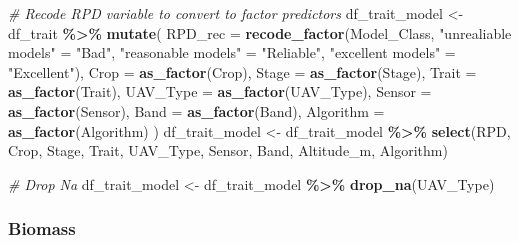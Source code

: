 \documentclass[
]{article}
\newenvironment{Shaded}{\begin{snugshade}}{\end{snugshade}}
\newcommand{\AttributeTok}[1]{\textcolor[rgb]{0.13,0.29,0.53}{#1}}
\newcommand{\CommentTok}[1]{\textcolor[rgb]{0.56,0.35,0.01}{\textit{#1}}}
\newcommand{\FunctionTok}[1]{\textcolor[rgb]{0.13,0.29,0.53}{\textbf{#1}}}
\newcommand{\NormalTok}[1]{#1}
\newcommand{\OtherTok}[1]{\textcolor[rgb]{0.56,0.35,0.01}{#1}}
\newcommand{\SpecialCharTok}[1]{\textcolor[rgb]{0.81,0.36,0.00}{\textbf{#1}}}
\newcommand{\StringTok}[1]{\textcolor[rgb]{0.31,0.60,0.02}{#1}}
\begin{document}
\begin{Shaded}
\begin{Highlighting}[]
\CommentTok{\# Recode RPD variable to convert to factor predictors}
\NormalTok{df\_trait\_model }\OtherTok{\textless{}{-}}\NormalTok{ df\_trait }\SpecialCharTok{\%\textgreater{}\%} 
  \FunctionTok{mutate}\NormalTok{(}
    \AttributeTok{RPD\_rec =} \FunctionTok{recode\_factor}\NormalTok{(Model\_Class, }
                            \StringTok{"unrealiable models"} \OtherTok{=} \StringTok{"Bad"}\NormalTok{,}
                            \StringTok{"reasonable models"} \OtherTok{=} \StringTok{"Reliable"}\NormalTok{,}
                            \StringTok{"excellent models"} \OtherTok{=} \StringTok{"Excellent"}\NormalTok{),}
    \AttributeTok{Crop =} \FunctionTok{as\_factor}\NormalTok{(Crop),}
    \AttributeTok{Stage =} \FunctionTok{as\_factor}\NormalTok{(Stage),}
    \AttributeTok{Trait =} \FunctionTok{as\_factor}\NormalTok{(Trait),}
    \AttributeTok{UAV\_Type =} \FunctionTok{as\_factor}\NormalTok{(UAV\_Type),}
    \AttributeTok{Sensor =} \FunctionTok{as\_factor}\NormalTok{(Sensor),}
    \AttributeTok{Band =} \FunctionTok{as\_factor}\NormalTok{(Band),}
    \AttributeTok{Algorithm =} \FunctionTok{as\_factor}\NormalTok{(Algorithm)}
\NormalTok{  )}
\NormalTok{df\_trait\_model }\OtherTok{\textless{}{-}}\NormalTok{ df\_trait\_model }\SpecialCharTok{\%\textgreater{}\%} 
  \FunctionTok{select}\NormalTok{(RPD, Crop, Stage, Trait, UAV\_Type, Sensor, Band, Altitude\_m, Algorithm)}
\end{Highlighting}
\end{Shaded}

\begin{Shaded}
\begin{Highlighting}[]
\CommentTok{\# Drop Na}
\NormalTok{df\_trait\_model }\OtherTok{\textless{}{-}}\NormalTok{ df\_trait\_model }\SpecialCharTok{\%\textgreater{}\%} \FunctionTok{drop\_na}\NormalTok{(UAV\_Type)}
\end{Highlighting}
\end{Shaded}

\hypertarget{biomass}{%
\subsubsection{Biomass}\label{biomass}}
\end{document}
